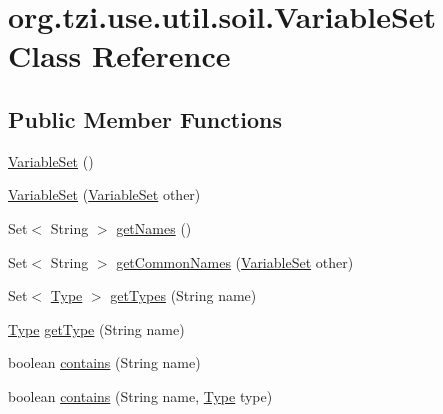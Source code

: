 \hypertarget{classorg_1_1tzi_1_1use_1_1util_1_1soil_1_1_variable_set}{\section{org.\-tzi.\-use.\-util.\-soil.\-Variable\-Set Class Reference}
\label{classorg_1_1tzi_1_1use_1_1util_1_1soil_1_1_variable_set}
}
\subsection*{Public Member Functions}
\begin{DoxyCompactItemize}
\item 
\hyperlink{classorg_1_1tzi_1_1use_1_1util_1_1soil_1_1_variable_set_af19b1a4fef2608e816d93efeb44d570c}{Variable\-Set} ()
\item 
\hyperlink{classorg_1_1tzi_1_1use_1_1util_1_1soil_1_1_variable_set_a14838dcc91346bb2cf733ee396c8ce39}{Variable\-Set} (\hyperlink{classorg_1_1tzi_1_1use_1_1util_1_1soil_1_1_variable_set}{Variable\-Set} other)
\item 
Set$<$ String $>$ \hyperlink{classorg_1_1tzi_1_1use_1_1util_1_1soil_1_1_variable_set_af60c5ad1805e776a8f1e5975a7811a89}{get\-Names} ()
\item 
Set$<$ String $>$ \hyperlink{classorg_1_1tzi_1_1use_1_1util_1_1soil_1_1_variable_set_ae7b63df5d319e5f887d713ac43e85c3d}{get\-Common\-Names} (\hyperlink{classorg_1_1tzi_1_1use_1_1util_1_1soil_1_1_variable_set}{Variable\-Set} other)
\item 
Set$<$ \hyperlink{interfaceorg_1_1tzi_1_1use_1_1uml_1_1ocl_1_1type_1_1_type}{Type} $>$ \hyperlink{classorg_1_1tzi_1_1use_1_1util_1_1soil_1_1_variable_set_a1cee34fc1d90a31e846c6fedca5c6cf1}{get\-Types} (String name)
\item 
\hyperlink{interfaceorg_1_1tzi_1_1use_1_1uml_1_1ocl_1_1type_1_1_type}{Type} \hyperlink{classorg_1_1tzi_1_1use_1_1util_1_1soil_1_1_variable_set_aad1306ea8209ba3a27a234334ddea64f}{get\-Type} (String name)
\item 
boolean \hyperlink{classorg_1_1tzi_1_1use_1_1util_1_1soil_1_1_variable_set_a871c2007676c9451705f5307005cf794}{contains} (String name)
\item 
boolean \hyperlink{classorg_1_1tzi_1_1use_1_1util_1_1soil_1_1_variable_set_a6a291e25cf9a7f2499f5b2c57feb22af}{contains} (String name, \hyperlink{interfaceorg_1_1tzi_1_1use_1_1uml_1_1ocl_1_1type_1_1_type}{Type} type)
\item 

\end{DoxyCompactItemize}
